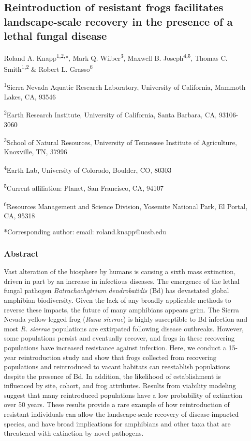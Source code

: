 \documentclass[
  letterpaper,
  DIV=11,
  numbers=noendperiod]{scrartcl}
\author{}
\date{}
\begin{document}
\captionsetup{format=plain, labelfont=bf, labelsep=space}

\subsection{Reintroduction of resistant frogs facilitates
landscape-scale recovery in the presence of a lethal fungal
disease}\label{reintroduction-of-resistant-frogs-facilitates-landscape-scale-recovery-in-the-presence-of-a-lethal-fungal-disease}

Roland A. Knapp\textsuperscript{1,2,}*, Mark Q.
Wilber\textsuperscript{3}, Maxwell B. Joseph\textsuperscript{4,5},
Thomas C. Smith\textsuperscript{1,2} \& Robert L.
Grasso\textsuperscript{6}

\textsuperscript{1}Sierra Nevada Aquatic Research Laboratory, University
of California, Mammoth Lakes, CA, 93546

\textsuperscript{2}Earth Research Institute, University of California,
Santa Barbara, CA, 93106-3060

\textsuperscript{3}School of Natural Resources, University of Tennessee
Institute of Agriculture, Knoxville, TN, 37996

\textsuperscript{4}Earth Lab, University of Colorado, Boulder, CO, 80303

\textsuperscript{5}Current affiliation: Planet, San Francisco, CA, 94107

\textsuperscript{6}Resources Management and Science Division, Yosemite
National Park, El Portal, CA, 95318

*Corresponding author: email: roland.knapp@ucsb.edu

\subsubsection{Abstract}\label{abstract}

Vast alteration of the biosphere by humans is causing a sixth mass
extinction, driven in part by an increase in infectious diseases. The
emergence of the lethal fungal pathogen \emph{Batrachochytrium
dendrobatidis} (Bd) has devastated global amphibian biodiversity. Given
the lack of any broadly applicable methods to reverse these impacts, the
future of many amphibians appears grim. The Sierra Nevada yellow-legged
frog (\emph{Rana sierrae}) is highly susceptible to Bd infection and
most \emph{R. sierrae} populations are extirpated following disease
outbreaks. However, some populations persist and eventually recover, and
frogs in these recovering populations have increased resistance against
infection. Here, we conduct a 15-year reintroduction study and show that
frogs collected from recovering populations and reintroduced to vacant
habitats can reestablish populations despite the presence of Bd. In
addition, the likelihood of establishment is influenced by site, cohort,
and frog attributes. Results from viability modeling suggest that many
reintroduced populations have a low probability of extinction over 50
years. These results provide a rare example of how reintroduction of
resistant individuals can allow the landscape-scale recovery of
disease-impacted species, and have broad implications for amphibians and
other taxa that are threatened with extinction by novel pathogens.
\end{document}
